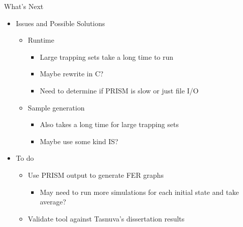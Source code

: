 \documentclass[10pt,ignorenonframetext,]{beamer}
\providecommand{\tightlist}{%
  \setlength{\itemsep}{0pt}\setlength{\parskip}{0pt}}
\begin{document}
\begin{frame}{What's Next}
\protect\hypertarget{whats-next}{}
\begin{itemize}[<+->]
\tightlist
\item
  Issues and Possible Solutions

  \begin{itemize}[<+->]
  \tightlist
  \item
    Runtime

    \begin{itemize}[<+->]
    \tightlist
    \item
      Large trapping sets take a long time to run
    \item
      Maybe rewrite in C?
    \item
      Need to determine if PRISM is slow or just file I/O
    \end{itemize}
  \item
    Sample generation

    \begin{itemize}[<+->]
    \tightlist
    \item
      Also takes a long time for large trapping sets
    \item
      Maybe use some kind IS?
    \end{itemize}
  \end{itemize}
\item
  To do

  \begin{itemize}[<+->]
  \tightlist
  \item
    Use PRISM output to generate FER graphs

    \begin{itemize}[<+->]
    \tightlist
    \item
      May need to run more simulations for each initial state and take
      average?
    \end{itemize}
  \item
    Validate tool against Tasnuva's dissertation results
  \end{itemize}
\end{itemize}
\end{frame}
\end{document}
